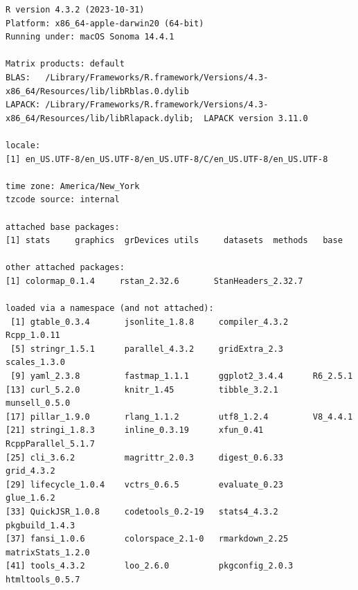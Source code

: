 \documentclass[
  letterpaper,
  DIV=11,
  numbers=noendperiod]{scrartcl}
\begin{document}
\begin{verbatim}
R version 4.3.2 (2023-10-31)
Platform: x86_64-apple-darwin20 (64-bit)
Running under: macOS Sonoma 14.4.1

Matrix products: default
BLAS:   /Library/Frameworks/R.framework/Versions/4.3-x86_64/Resources/lib/libRblas.0.dylib 
LAPACK: /Library/Frameworks/R.framework/Versions/4.3-x86_64/Resources/lib/libRlapack.dylib;  LAPACK version 3.11.0

locale:
[1] en_US.UTF-8/en_US.UTF-8/en_US.UTF-8/C/en_US.UTF-8/en_US.UTF-8

time zone: America/New_York
tzcode source: internal

attached base packages:
[1] stats     graphics  grDevices utils     datasets  methods   base     

other attached packages:
[1] colormap_0.1.4     rstan_2.32.6       StanHeaders_2.32.7

loaded via a namespace (and not attached):
 [1] gtable_0.3.4       jsonlite_1.8.8     compiler_4.3.2     Rcpp_1.0.11       
 [5] stringr_1.5.1      parallel_4.3.2     gridExtra_2.3      scales_1.3.0      
 [9] yaml_2.3.8         fastmap_1.1.1      ggplot2_3.4.4      R6_2.5.1          
[13] curl_5.2.0         knitr_1.45         tibble_3.2.1       munsell_0.5.0     
[17] pillar_1.9.0       rlang_1.1.2        utf8_1.2.4         V8_4.4.1          
[21] stringi_1.8.3      inline_0.3.19      xfun_0.41          RcppParallel_5.1.7
[25] cli_3.6.2          magrittr_2.0.3     digest_0.6.33      grid_4.3.2        
[29] lifecycle_1.0.4    vctrs_0.6.5        evaluate_0.23      glue_1.6.2        
[33] QuickJSR_1.0.8     codetools_0.2-19   stats4_4.3.2       pkgbuild_1.4.3    
[37] fansi_1.0.6        colorspace_2.1-0   rmarkdown_2.25     matrixStats_1.2.0 
[41] tools_4.3.2        loo_2.6.0          pkgconfig_2.0.3    htmltools_0.5.7   
\end{verbatim}
\end{document}
